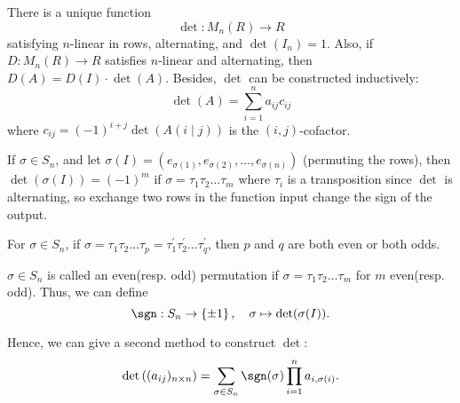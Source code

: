 \begin{prev}
    There is a unique function 
    \[
        \det : M_n(R) \to R
    \] satisfying \(n\)-linear in rows, alternating, and \(\det (I_n) = 1\). Also, if \(D: M_n(R) \to R\) satisfies \(n\)-linear and alternating, then \(D(A) = D(I) \cdot \det (A)\). Besides, \(\det \) can be constructed inductively:
    \[
        \det (A) = \sum_{i=1}^n a_{ij} c_{ij} 
    \]  where \(c_{ij} = (-1)^{i + j} \det \left( A(i \mid j) \right) \) is the \((i, j)\)-cofactor. 
\end{prev}
If \(\sigma \in S_n\), and let \(\sigma (I) = (e_{\sigma (1)}, e_{\sigma (2)}, \dots , e_{\sigma (n)})\) (permuting the rows), then \(\det (\sigma (I)) = (-1)^m\) if \(\sigma = \tau _1 \tau _2 \dots \tau _m\) where \(\tau _i\) is a transposition since \(\det \) is alternating, so exchange two rows in the function input change the sign of the output. 

\begin{corollary}
    For \(\sigma \in S_n\), if \(\sigma = \tau _1 \tau _2 \dots \tau _p = \tau _1^{\prime} \tau _2^{\prime} \dots \tau _q^{\prime} \), then \(p\) and \(q\) are both even or both odds.    
\end{corollary}

\begin{definition}
    \(\sigma \in S_n\) is called an even(resp. odd) permutation if \(\sigma = \tau _1 \tau _2 \dots \tau _m\) for \(m\) even(resp. odd). Thus, we can define 
    \[
        \sgn : S_n \to \left\{ \pm 1 \right\}, \quad \sigma \mapsto \det (\sigma (I)). 
    \]   
\end{definition}

Hence, we can give a second method to construct \(\det \):
\[
    \det \left( (a_{ij})_{n \times n} \right) = \sum_{\sigma \in S_n} \sgn (\sigma ) \prod _{i=1}^n a_{i, \sigma (i)}.  
\] 

